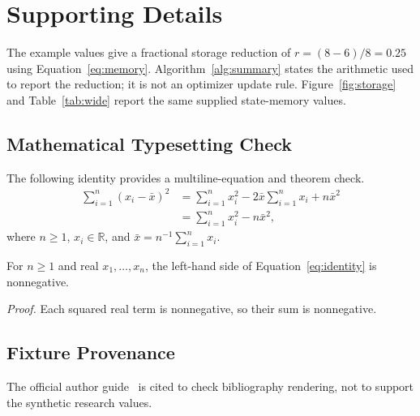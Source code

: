 \section{Supporting Details}\label{app:supporting}
The example values give a fractional storage reduction of $r=(8-6)/8=0.25$ using Equation~\ref{eq:memory}.
Algorithm~\ref{alg:summary} states the arithmetic used to report the reduction; it is not an optimizer update rule.
Figure~\ref{fig:storage} and Table~\ref{tab:wide} report the same supplied state-memory values.

\subsection{Mathematical Typesetting Check}
The following identity provides a multiline-equation and theorem check.
\begin{equation}\label{eq:identity}
\begin{aligned}
\sum_{i=1}^{n}(x_i-\bar{x})^2
 &=\sum_{i=1}^{n}x_i^2-2\bar{x}\sum_{i=1}^{n}x_i+n\bar{x}^2\\
 &=\sum_{i=1}^{n}x_i^2-n\bar{x}^2,
\end{aligned}
\end{equation}
where $n\geq1$, $x_i\in\mathbb{R}$, and $\bar{x}=n^{-1}\sum_{i=1}^{n}x_i$.
\begin{PWTheorem}
For $n\geq1$ and real $x_1,\ldots,x_n$, the left-hand side of Equation~\ref{eq:identity} is nonnegative.
\end{PWTheorem}
\textit{Proof.} Each squared real term is nonnegative, so their sum is nonnegative.

\subsection{Fixture Provenance}
The official author guide~\cite{formatguide} is cited to check bibliography rendering, not to support the synthetic research values.
